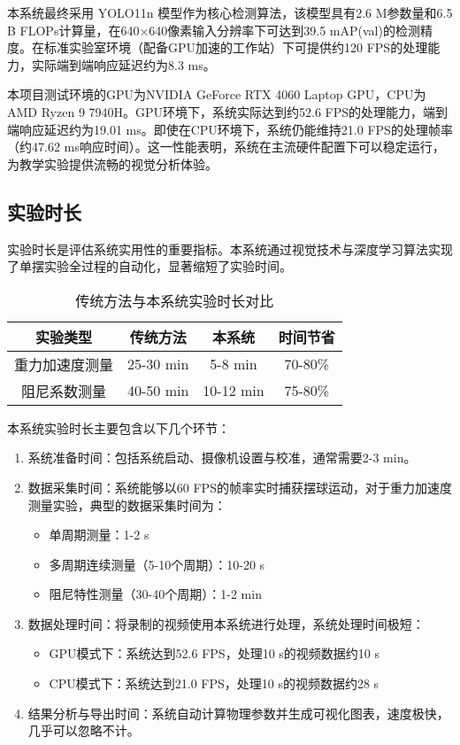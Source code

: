 本系统最终采用 YOLO11n 模型作为核心检测算法，该模型具有2.6 M参数量和6.5 B FLOPs计算量，在640×640像素输入分辨率下可达到39.5 mAP(val)的检测精度。在标准实验室环境（配备GPU加速的工作站）下可提供约120 FPS的处理能力，实际端到端响应延迟约为8.3 ms。

本项目测试环境的GPU为NVIDIA GeForce RTX 4060 Laptop GPU，CPU为AMD Ryzen 9 7940H。GPU环境下，系统实际达到约52.6 FPS的处理能力，端到端响应延迟约为19.01 ms。即使在CPU环境下，系统仍能维持21.0 FPS的处理帧率（约47.62 ms响应时间）。这一性能表明，系统在主流硬件配置下可以稳定运行，为教学实验提供流畅的视觉分析体验。

\subsection{实验时长}
实验时长是评估系统实用性的重要指标。本系统通过视觉技术与深度学习算法实现了单摆实验全过程的自动化，显著缩短了实验时间。

\begin{table}[ht]
\centering
\caption{传统方法与本系统实验时长对比}
\setlength{\tabcolsep}{7mm}
\begin{tabular}{@{}c c c c@{}}
\toprule
\textbf{实验类型} & \textbf{传统方法} & \textbf{本系统} & \textbf{时间节省} \\
\midrule
重力加速度测量 & 25-30 min & 5-8 min & 70-80\% \\
阻尼系数测量 & 40-50 min & 10-12 min & 75-80\% \\
\bottomrule
\end{tabular}
\label{tab:experiment_duration}
\end{table}


本系统实验时长主要包含以下几个环节：

\begin{enumerate}[leftmargin=*]
    \item 系统准备时间：包括系统启动、摄像机设置与校准，通常需要2-3 min。

    \item 数据采集时间：系统能够以60 FPS的帧率实时捕获摆球运动，对于重力加速度测量实验，典型的数据采集时间为：
        \begin{itemize}
            \item 单周期测量：1-2 s
            \item 多周期连续测量（5-10个周期）：10-20 s
            \item 阻尼特性测量（30-40个周期）：1-2 min
        \end{itemize}
    
    \item 数据处理时间：将录制的视频使用本系统进行处理，系统处理时间极短：
        \begin{itemize}
            \item GPU模式下：系统达到52.6 FPS，处理10 s的视频数据约10 s
            \item CPU模式下：系统达到21.0 FPS，处理10 s的视频数据约28 s
        \end{itemize}
    
    \item 结果分析与导出时间：系统自动计算物理参数并生成可视化图表，速度极快，几乎可以忽略不计。
\end{enumerate}

